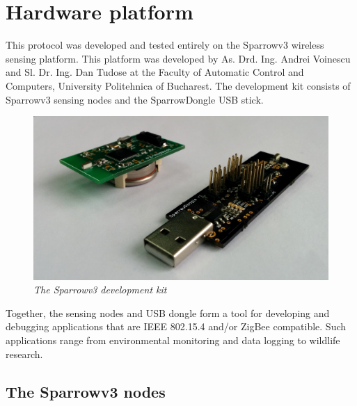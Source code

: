 
\chapter{Hardware platform}

This protocol was developed and tested entirely on the Sparrowv3 wireless
sensing platform. This platform was developed by As. Drd. Ing. Andrei Voinescu
and Sl. Dr. Ing. Dan Tudose at the Faculty of Automatic Control and Computers,
University Politehnica of Bucharest. The development kit consists of Sparrowv3
sensing nodes and the SparrowDongle USB stick.

\begin{figure}[ht]
	\begin{center}
		\includegraphics[width=\textwidth]{img/sparrowv3_kit.jpg}
	\end{center}
	\caption{\small \itshape{The Sparrowv3 development kit}}
\end{figure}

Together, the sensing nodes and USB dongle form a tool for developing and
debugging applications that are IEEE 802.15.4 and/or ZigBee compatible. Such
applications range from environmental monitoring and data logging to wildlife
research.

\section{The Sparrowv3 nodes}

